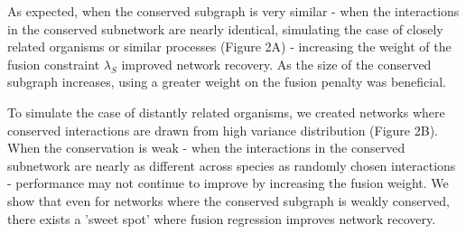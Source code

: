\documentclass[11pt]{article}
\begin{document}
As expected, when the conserved subgraph is very similar - when the interactions in the conserved subnetwork are nearly identical, simulating the case of closely related organisms or similar processes (Figure 2A) - increasing the weight of the fusion constraint $\lambda_S$ improved network recovery. As the size of the conserved subgraph increases, using a greater weight on the fusion penalty was beneficial.

To simulate the case of distantly related organisms, we created networks where conserved interactions are drawn from high variance distribution (Figure 2B). When the conservation is weak - when the interactions in the conserved subnetwork are nearly as different across species as randomly chosen interactions - performance may not continue to improve by increasing the fusion weight. We show that even for networks where the conserved subgraph is weakly conserved, there exists a 'sweet spot' where fusion regression improves network recovery. 
\end{document}
